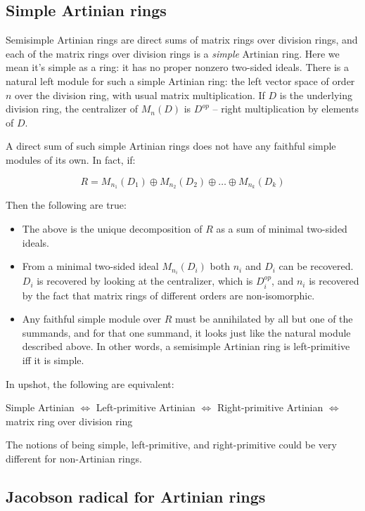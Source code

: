 \documentclass[a4paper]{amsart}
\begin{document}
\subsection{Simple Artinian rings}

Semisimple Artinian rings are direct sums of matrix rings over
division rings, and each of the matrix rings over division rings is a
{\em simple} Artinian ring. Here we mean it's simple as a ring: it has
no proper nonzero two-sided ideals. There is a natural left module for
such a simple Artinian ring: the left vector space of order $n$ over
the division ring, with usual matrix multiplication. If $D$ is the
underlying division ring, the centralizer of $M_n(D)$ is $D^{op}$ --
right multiplication by elements of $D$.

A direct sum of such simple Artinian rings does not have any faithful
simple modules of its own. In fact, if:

$$R = M_{n_1}(D_1) \oplus M_{n_2}(D_2) \oplus \ldots \oplus M_{n_k}(D_k)$$

Then the following are true:

\begin{itemize}

\item The above is the unique decomposition of $R$ as a sum of minimal
  two-sided ideals.

\item From a minimal two-sided ideal $M_{n_i}(D_i)$ both $n_i$ and
  $D_i$ can be recovered. $D_i$ is recovered by looking at the
  centralizer, which is $D_i^{op}$, and $n_i$ is recovered by the fact
  that matrix rings of different orders are non-isomorphic.

\item Any faithful simple module over $R$ must be annihilated by all
  but one of the summands, and for that one summand, it looks just
  like the natural module described above. In other words, a
  semisimple Artinian ring is left-primitive iff it is simple.

\end{itemize}

In upshot, the following are equivalent:

Simple Artinian $\iff$ Left-primitive Artinian $\iff$ Right-primitive
Artinian $\iff$ matrix ring over division ring

The notions of being simple, left-primitive, and right-primitive could
be very different for non-Artinian rings.

\subsection{Jacobson radical for Artinian rings}
\end{document}
